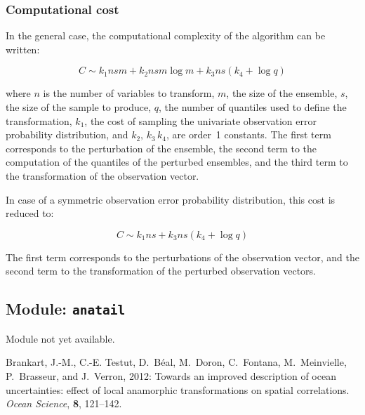 \documentclass[11pt]{article}
\begin{document}
\subsubsection*{Computational cost}

In the general case, the computational complexity of the algorithm can be written:

\begin{equation}
C \sim k_1 n s m  +  k_2 n s m \log m + k_3 n s ( k_4 + \log q )
\end{equation}

\noindent
where $n$ is the number of variables to transform,
$m$, the size of the ensemble,
$s$, the size of the sample to produce,
$q$, the number of quantiles used to define the transformation,
$k_1$, the cost of sampling the univariate observation error probability distribution, and
$k_2,\,k_3\,k_4$, are order~1 constants.
The first term corresponds to the perturbation of the ensemble,
the second term to the computation of the quantiles of the perturbed ensembles,
and the third term to the transformation of the observation vector.

In case of a symmetric observation error probability distribution,
this cost is reduced to:

\begin{equation}
C \sim k_1 n s + k_3 n s ( k_4 + \log q )
\end{equation}

\noindent
The first term corresponds to the perturbations of the observation vector,
and the second term to the transformation of the perturbed observation vectors.

\subsection{Module: {\tt\bf anatail}}

Module not yet available.

\begin{thebibliography}{}

Brankart, J.-M., C.-E. Testut, D.~B\'eal, M.~Doron, C.~Fontana, M.~Meinvielle,
P.~Brasseur, and J.~Verron, 2012: Towards an improved description of ocean
uncertainties: effect of local anamorphic transformations on spatial
correlations. \textit{Ocean Science}, \textbf{8}, 121--142.

\end{thebibliography}
\end{document}
